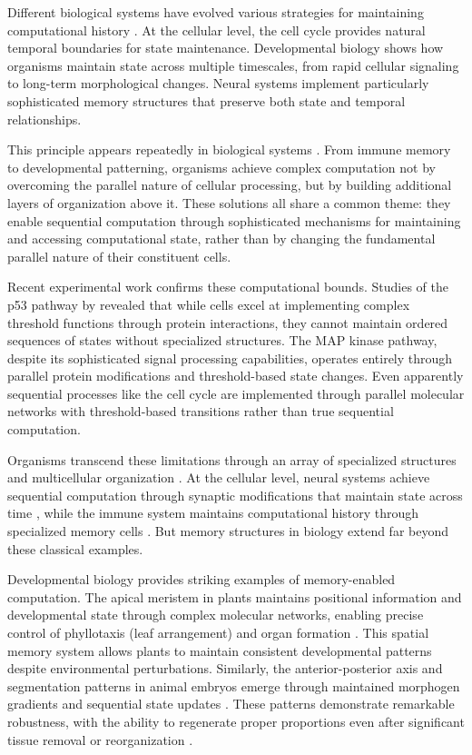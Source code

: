 \documentclass[12pt]{article}
\begin{document}
Different biological systems have evolved various strategies for maintaining computational history \cite{espinosa2024molecular}. At the cellular level, the cell cycle provides natural temporal boundaries for state maintenance. Developmental biology shows how organisms maintain state across multiple timescales, from rapid cellular signaling to long-term morphological changes. Neural systems implement particularly sophisticated memory structures that preserve both state and temporal relationships.

This principle appears repeatedly in biological systems \cite{fu2024memory}. From immune memory to developmental patterning, organisms achieve complex computation not by overcoming the parallel nature of cellular processing, but by building additional layers of organization above it. These solutions all share a common theme: they enable sequential computation through sophisticated mechanisms for maintaining and accessing computational state, rather than by changing the fundamental parallel nature of their constituent cells.

Recent experimental work confirms these computational bounds. Studies of the p53 pathway by \cite{batchelor2023dynamic} revealed that while cells excel at implementing complex threshold functions through protein interactions, they cannot maintain ordered sequences of states without specialized structures. The MAP kinase pathway, despite its sophisticated signal processing capabilities, operates entirely through parallel protein modifications and threshold-based state changes. Even apparently sequential processes like the cell cycle are implemented through parallel molecular networks with threshold-based transitions rather than true sequential computation.

Organisms transcend these limitations through an array of specialized structures and multicellular organization \cite{espinosa2024molecular}. At the cellular level, neural systems achieve sequential computation through synaptic modifications that maintain state across time \cite{fu2024memory}, while the immune system maintains computational history through specialized memory cells \cite{niu2022computational}. But memory structures in biology extend far beyond these classical examples.

Developmental biology provides striking examples of memory-enabled computation. The apical meristem in plants maintains positional information and developmental state through complex molecular networks, enabling precise control of phyllotaxis (leaf arrangement) and organ formation \cite{lovkvist2021using}. This spatial memory system allows plants to maintain consistent developmental patterns despite environmental perturbations. Similarly, the anterior-posterior axis and segmentation patterns in animal embryos emerge through maintained morphogen gradients and sequential state updates \cite{pastor2020computation}. These patterns demonstrate remarkable robustness, with the ability to regenerate proper proportions even after significant tissue removal or reorganization \cite{lobo2012towards}.
\end{document}

